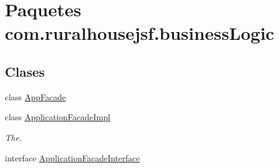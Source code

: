 \hypertarget{a00108}{}\section{Paquetes com.\+ruralhousejsf.\+business\+Logic}
\label{a00108}
\subsection*{Clases}
\begin{DoxyCompactItemize}
\item 
class \mbox{\hyperlink{a00128}{App\+Facade}}
\item 
class \mbox{\hyperlink{a00132}{Application\+Facade\+Impl}}
\begin{DoxyCompactList}\small\item\em The. \end{DoxyCompactList}\item 
interface \mbox{\hyperlink{a00136}{Application\+Facade\+Interface}}
\end{DoxyCompactItemize}
